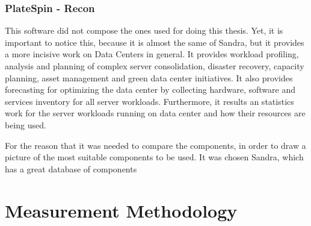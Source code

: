 \subsubsection{PlateSpin - Recon} \label{subsubsec3:power_recon}
    This software did not compose the ones used for doing this thesis. Yet, it is important to notice this, because it is almost the same of Sandra, but it provides a more incisive work on Data Centers in general. It provides workload profiling, analysis and planning of complex server consolidation, disaster recovery, capacity planning, asset management and green data center initiatives. It also provides forecasting for optimizing the data center by collecting hardware, software and services inventory for all server workloads. Furthermore, it results an statistics work for the server workloads running on data center and how their resources are being used.
    
    For the reason that it was needed to compare the components, in order to draw a picture of the most suitable components to be used. It was chosen Sandra, which has a great database of components 

\section{Measurement Methodology} \label{sec3:measurement_methodology}

